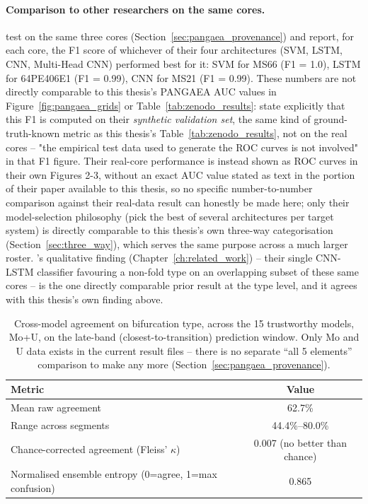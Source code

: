 \paragraph{Comparison to other researchers on the same cores.} \citet{ma2025sdml} test on the same three cores (Section~\ref{sec:pangaea_provenance}) and report, for each core, the F1 score of whichever of their four architectures (SVM, LSTM, CNN, Multi-Head CNN) performed best for it: SVM for MS66 (F1 = 1.0), LSTM for 64PE406E1 (F1 = 0.99), CNN for MS21 (F1 = 0.99). These numbers are not directly comparable to this thesis's PANGAEA AUC values in Figure~\ref{fig:pangaea_grids} or Table~\ref{tab:zenodo_results}: \citet{ma2025sdml} state explicitly that this F1 is computed on their \emph{synthetic validation set}, the same kind of ground-truth-known metric as this thesis's Table~\ref{tab:zenodo_results}, not on the real cores -- "the empirical test data used to generate the ROC curves is not involved" in that F1 figure. Their real-core performance is instead shown as ROC curves in their own Figures 2-3, without an exact AUC value stated as text in the portion of their paper available to this thesis, so no specific number-to-number comparison against their real-data result can honestly be made here; only their model-selection philosophy (pick the best of several architectures per target system) is directly comparable to this thesis's own three-way categorisation (Section~\ref{sec:three_way}), which serves the same purpose across a much larger roster. \citet{babazadeh2025}'s qualitative finding (Chapter~\ref{ch:related_work}) -- their single CNN-LSTM classifier favouring a non-fold type on an overlapping subset of these same cores -- is the one directly comparable prior result at the type level, and it agrees with this thesis's own finding above.

\begin{table}[htbp]
\centering
\caption{Cross-model agreement on bifurcation type, across the 15 trustworthy models, Mo+U, on the late-band (closest-to-transition) prediction window. Only Mo and U data exists in the current result files -- there is no separate ``all 5 elements'' comparison to make any more (Section~\ref{sec:pangaea_provenance}).}
\label{tab:type_reliability}
\begin{tabular}{lc}
\toprule
Metric & Value \\
\midrule
Mean raw agreement & 62.7\% \\
Range across segments & 44.4\%--80.0\% \\
Chance-corrected agreement (Fleiss' $\kappa$) & 0.007 (no better than chance) \\
Normalised ensemble entropy (0=agree, 1=max confusion) & 0.865 \\
\bottomrule
\end{tabular}
\end{table}

